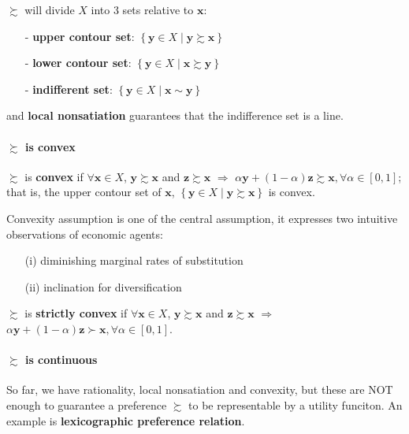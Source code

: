 $\succsim$ will divide $X$ into 3 sets relative to $\mathbf{x}$:
\begin{enumerate}
    \item[-] \textbf{upper contour set}: $\left\{\mathbf{y}\in X\mid \mathbf{y}\succsim \mathbf{x} \right\}$  
    \item[-] \textbf{lower contour set}: $\left\{\mathbf{y}\in X \mid \mathbf{x}\succsim \mathbf{y}\right\}$ 
    \item[-] \textbf{indifferent set}: $\left\{\mathbf{y}\in X \mid \mathbf{x}\sim \mathbf{y}\right\}$ 
\end{enumerate}
and \textbf{local nonsatiation} guarantees that the indifference set is a line.

\paragraph*{$\succsim$ is convex}
$\succsim$ is \textbf{convex} if $\forall \mathbf{x}\in X$, $\mathbf{y}\succsim\mathbf{x}$ and $\mathbf{z}\succsim\mathbf{x}$ $\Rightarrow$ $\alpha \mathbf{y}+(1-\alpha)\mathbf{z}\succsim \mathbf{x},\forall \alpha \in [0,1]$; that is, the upper contour set of $\mathbf{x}$, $\left\{\mathbf{y}\in X\mid \mathbf{y}\succsim \mathbf{x} \right\}$ is convex.

Convexity assumption is one of the central assumption, it expresses two intuitive observations of economic agents:
\begin{enumerate}
    \item[(i)] diminishing marginal rates of substitution
    \item[(ii)] inclination for diversification  
\end{enumerate}

$\succsim$ is \textbf{strictly convex} if $\forall \mathbf{x}\in X$, $\mathbf{y}\succsim\mathbf{x}$ and $\mathbf{z}\succsim\mathbf{x}$ $\Rightarrow$ $\alpha \mathbf{y}+(1-\alpha)\mathbf{z}\succ \mathbf{x},\forall \alpha \in [0,1]$.

\paragraph*{$\succsim$ is continuous}
So far, we have rationality, local nonsatiation and convexity, but these are NOT enough to guarantee a preference $\succsim$ to be representable by a utility funciton. An example is \textbf{lexicographic preference relation}.

